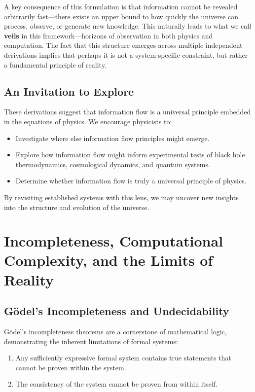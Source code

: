 \documentclass[12pt]{article}
\begin{document}
A key consequence of this formulation is that information cannot be revealed arbitrarily fast—there exists an upper bound to how quickly the universe can process, observe, or generate new knowledge. This naturally leads to what we call \textbf{veils} in this framework—horizons of observation in both physics and computation. The fact that this structure emerges across multiple independent derivations implies that perhaps it is not a system-specific constraint, but rather a fundamental principle of reality.

\subsection{An Invitation to Explore}

These derivations suggest that information flow is a universal principle embedded in the equations of physics. We encourage physicists to:
\begin{itemize}
    \item Investigate where else information flow principles might emerge.
    \item Explore how information flow might inform experimental tests of black hole thermodynamics, cosmological dynamics, and quantum systems.
    \item Determine whether information flow is truly a universal principle of physics.
\end{itemize}
By revisiting established systems with this lens, we may uncover new insights into the structure and evolution of the universe.

\section{Incompleteness, Computational Complexity, and the Limits of Reality}

\subsection{Gödel’s Incompleteness and Undecidability}

Gödel’s incompleteness theorems are a cornerstone of mathematical logic, demonstrating the inherent limitations of formal systems:
\begin{enumerate}
    \item Any sufficiently expressive formal system contains true statements that cannot be proven within the system.
    \item The consistency of the system cannot be proven from within itself.
\end{enumerate}
\end{document}
